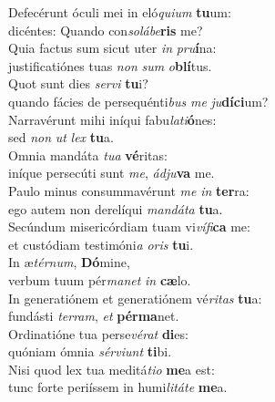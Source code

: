 \evenverse Defecérunt óculi mei in eló\textit{qui}\textit{um} \textbf{tu}um:~\*\\
\evenverse dicéntes: Quando con\textit{so}\textit{lá}\textit{be}\textbf{ris} me?\\
\oddverse Quia factus sum sicut uter \textit{in} \textit{pru}\textbf{í}na:~\*\\
\oddverse justificatiónes tuas \textit{non} \textit{sum} \textit{o}\textbf{blí}tus.\\
\evenverse Quot sunt dies \textit{ser}\textit{vi} \textbf{tu}i?~\*\\
\evenverse quando fácies de persequénti\textit{bus} \textit{me} \textit{ju}\textbf{dí}\textbf{ci}um?\\
\oddverse Narravérunt mihi iníqui fabu\textit{la}\textit{ti}\textbf{ó}nes:~\*\\
\oddverse sed \textit{non} \textit{ut} \textit{lex} \textbf{tu}a.\\
\evenverse Omnia mandáta \textit{tu}\textit{a} \textbf{vé}ritas:~\*\\
\evenverse iníque persecúti sunt \textit{me}, \textit{ád}\textit{ju}\textbf{va} me.\\
\oddverse Paulo minus consummavérunt \textit{me} \textit{in} \textbf{ter}ra:~\*\\
\oddverse ego autem non derelíqui \textit{man}\textit{dá}\textit{ta} \textbf{tu}a.\\
\evenverse Secúndum misericórdiam tuam vi\textit{ví}\textit{fi}\textbf{ca} me:~\*\\
\evenverse et custódiam testimóni\textit{a} \textit{o}\textit{ris} \textbf{tu}i.\\
\oddverse In æ\textit{tér}\textit{num}, \textbf{Dó}mine,~\*\\
\oddverse verbum tuum pér\textit{ma}\textit{net} \textit{in} \textbf{cæ}lo.\\
\evenverse In generatiónem et generatiónem vé\textit{ri}\textit{tas} \textbf{tu}a:~\*\\
\evenverse fundásti \textit{ter}\textit{ram}, \textit{et} \textbf{pér}\textbf{ma}net.\\
\oddverse Ordinatióne tua perse\textit{vé}\textit{rat} \textbf{di}es:~\*\\
\oddverse quóniam ómnia \textit{sér}\textit{vi}\textit{unt} \textbf{ti}bi.\\
\evenverse Nisi quod lex tua meditá\textit{ti}\textit{o} \textbf{me}a est:~\*\\
\evenverse tunc forte periíssem in humi\textit{li}\textit{tá}\textit{te} \textbf{me}a.\\
